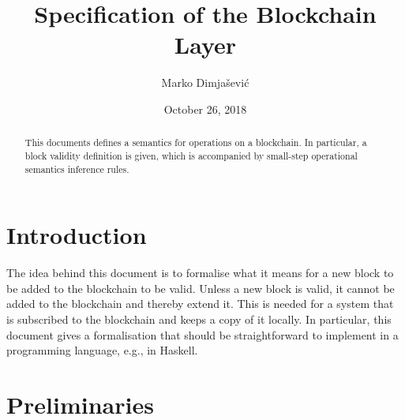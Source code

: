 \documentclass[11pt,a4paper]{article}
\begin{document}
\title{Specification of the Blockchain Layer}

\author{Marko Dimjašević}

\date{October 26, 2018}

\maketitle

\begin{abstract}
This documents defines a semantics for operations on a blockchain.
%
In particular, a block validity definition is given, which is accompanied by
small-step operational semantics inference rules.
\end{abstract}

\tableofcontents
\listoffigures

\section{Introduction}
\label{sec:introduction}

The idea behind this document is to formalise what it means for a new block to
be added to the blockchain to be valid.
%
Unless a new block is valid, it cannot be added to the blockchain and thereby
extend it.
%
This is needed for a system that is subscribed to the blockchain and keeps a
copy of it locally.
%
In particular, this document gives a formalisation that should be
straightforward to implement in a programming language, e.g., in Haskell.


\section{Preliminaries}
\label{sec:preliminaries}
\end{document}
